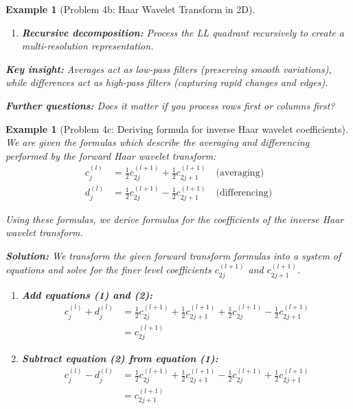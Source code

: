\documentclass[11pt,a4paper]{article}
\newtheorem{example}[theorem]{Example}
\begin{document}
\begin{example}[Problem 4b: Haar Wavelet Transform in 2D]
\begin{enumerate}
    \item \textbf{Recursive decomposition:} Process the LL quadrant recursively to create a multi-resolution representation.
\end{enumerate}

\textbf{Key insight:} Averages act as low-pass filters (preserving smooth variations), while differences act as high-pass filters (capturing rapid changes and edges).

\textbf{Further questions:} Does it matter if you process rows first or columns first?
\end{example}

\begin{example}[Problem 4c: Deriving formula for inverse Haar wavelet coefficients]
We are given the formulas which describe the averaging and differencing performed by the forward Haar wavelet transform:
\begin{align}
c_j^{(l)} &= \frac{1}{2}c_{2j}^{(l+1)} + \frac{1}{2}c_{2j+1}^{(l+1)} \quad \text{(averaging)}\\
d_j^{(l)} &= \frac{1}{2}c_{2j}^{(l+1)} - \frac{1}{2}c_{2j+1}^{(l+1)} \quad \text{(differencing)}
\end{align}

Using these formulas, we derive formulas for the coefficients of the inverse Haar wavelet transform.

\textbf{Solution:}
We transform the given forward transform formulas into a system of equations and solve for the finer level coefficients $c_{2j}^{(l+1)}$ and $c_{2j+1}^{(l+1)}$.

\begin{enumerate}
\item \textbf{Add equations (1) and (2):}
\begin{align}
c_j^{(l)} + d_j^{(l)} &= \frac{1}{2}c_{2j}^{(l+1)} + \frac{1}{2}c_{2j+1}^{(l+1)} + \frac{1}{2}c_{2j}^{(l+1)} - \frac{1}{2}c_{2j+1}^{(l+1)}\\
&= c_{2j}^{(l+1)}
\end{align}

\item \textbf{Subtract equation (2) from equation (1):}
\begin{align}
c_j^{(l)} - d_j^{(l)} &= \frac{1}{2}c_{2j}^{(l+1)} + \frac{1}{2}c_{2j+1}^{(l+1)} - \frac{1}{2}c_{2j}^{(l+1)} + \frac{1}{2}c_{2j+1}^{(l+1)}\\
&= c_{2j+1}^{(l+1)}
\end{align}
\end{enumerate}


\end{example}
\end{document}
